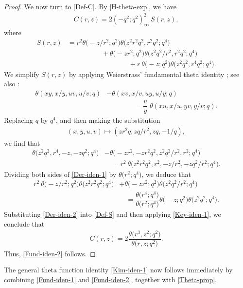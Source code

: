 \documentclass[12pt,reqno]{amsart}
\numberwithin{equation}{section}
\theoremstyle{plain}
\theoremstyle{definition}
\begin{document}
\begin{proof}
We now turn to \eqref{Def-C}. By \eqref{H-theta-exp}, we have
\begin{align*}
C(r,z)=2(-q^2;q^2)_\infty^2\!\:S(r,z),
\end{align*}
where
\begin{align}
S(r,z) &=r^2\theta\big({-}z/r^2;q^2\big)\theta\big(z^2r^2q^2,r^2q^2;q^4\big)
\nonumber\\
 &\qquad\qquad\quad+\theta\big({-}zr^2;q^2\big)\theta\big(z^2q^2/r^2,r^2q^2;q^4\big)
\nonumber\\
 &\qquad\qquad\qquad\qquad\quad+r\!\:\theta\big({-}z;q^2\big)
\theta\big(z^2q^2,r^4q^2;q^4\big).\label{Def-S}
\end{align}
We simplify $S(r,z)$ by applying Weierstrass' fundamental theta identity
\cite{Wei1882}; see also \cite[Eq.~(11.4.3)]{GR2004}:
\begin{align}
\theta(xy,x/y,uv,u/v;q) &-\theta(xv,x/v,uy,u/y;q)\nonumber\\
 &\qquad\qquad=\dfrac{u}{y}\!\;\theta(xu,x/u,yv,y/v;q).\label{Wei-iden}
\end{align}
Replacing $q$ by $q^4$, and then making the substitution
\begin{align*}
(x,y,u,v)\mapsto(zr^2q,zq/r^2,zq,-1/q),
\end{align*}
we find that
\begin{align}
\theta\big(z^2q^2,r^4,-z,-zq^2;q^4\big) &-\theta\big({-}zr^2,-zr^2q^2,z^2q^2/r^2,r^2;
q^4\big)\nonumber\\
 &\quad=r^2\!\:\theta\big(z^2r^2q^2,r^2,-z/r^2,-zq^2/r^2;q^4\big).\label{Der-iden-1}
\end{align}
Dividing both sides of \eqref{Der-iden-1} by $\theta\big(r^2;q^4\big)$, we deduce that
\begin{align}
r^2\!\:\theta\big({-}z/r^2;q^2\big)\theta\big(z^2r^2q^2;q^4\big)
 &+\theta\big({-}zr^2;q^2\big)\theta\big(z^2q^2/r^2;q^4\big)\nonumber\\
 &\quad=\dfrac{\theta\big(r^4;q^4\big)}{\theta\big(r^2;q^4\big)}\theta\big({-}z;q^2\big)
\theta\big(z^2q^2;q^4\big).\label{Der-iden-2}
\end{align}
Substituting \eqref{Der-iden-2} into \eqref{Def-S} and then applying
\eqref{Key-iden-1}, we conclude that
\begin{align*}
C(r,z)=2\dfrac{\theta\big(r^3,z^2;q^2\big)}{\theta\big(r,z;q^2\big)}.
\end{align*}
Thus, \eqref{Fund-iden-2} follows.
\end{proof}

The general theta function identity \eqref{Kim-iden-1} now follows immediately by
combining \eqref{Fund-iden-1} and \eqref{Fund-iden-2}, together with \eqref{Theta-prop}.
\end{document}
